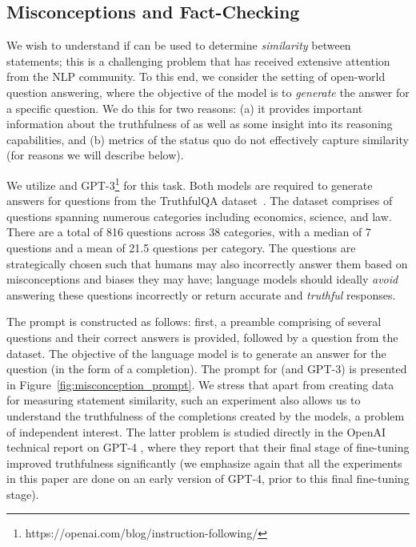 \subsection{Misconceptions and Fact-Checking}
\label{subsec:facts}




We wish to understand if \DV can be used to determine \textit{similarity} between statements; this is a challenging problem that has received extensive attention from the NLP community. To this end, we consider the setting of open-world question answering, where the objective of the model is to \textit{generate} the answer for a specific question. We do this for two reasons: (a) it provides important information about the truthfulness of \DV as well as some insight into its reasoning capabilities, and (b) metrics of the status quo do not effectively capture similarity (for reasons we will describe below). 

\vspace{1mm}
 We utilize \DV and GPT-3\footnote{https://openai.com/blog/instruction-following/} for this task. Both models are required to generate answers for questions from the TruthfulQA dataset~\cite{lin2021truthfulqa}. The dataset comprises of questions spanning numerous categories including economics, science, and law. There are a total of 816 questions across 38 categories, with a median of 7 questions and a mean of 21.5 questions per category. The questions are strategically chosen such that humans may also incorrectly answer them based on misconceptions and biases they may have; language models should ideally \textit{avoid} answering these questions incorrectly or return accurate and \textit{truthful} responses. 

The prompt is constructed as follows: first, a preamble comprising of several questions and their correct answers is provided, followed by a question from the dataset. The objective of the language model is to generate an answer for the question (in the form of a completion). The prompt for \DV (and GPT-3) is presented in Figure~\ref{fig:misconception_prompt}. We stress that apart from creating data for measuring statement similarity, such an experiment also allows us to understand the truthfulness of the completions created by the models, a problem of independent interest. The latter problem is studied directly in the OpenAI technical report on GPT-4 \cite{gpt4}, where they report that their final stage of fine-tuning improved truthfulness significantly (we emphasize again that all the experiments in this paper are done on an early version of GPT-4, prior to this final fine-tuning stage). 

